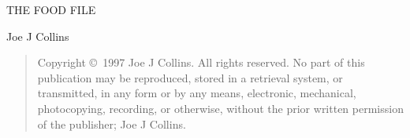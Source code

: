 \documentclass{cookbook}
\begin{document}
\thispagestyle{empty}
\begin{center}
\Huge THE FOOD FILE
\end{center}
\vfill
\begin{center}
Joe J Collins
\end{center}
\clearpage
\strut %
\vfill
\begin{quotation}
\begin{rmfamily}
Copyright \copyright\ 1997 Joe J Collins.
All rights reserved.
No part of this publication may be reproduced,
stored in a retrieval system,
or transmitted,
in any form or by any means,
electronic,
mechanical,
photocopying,
recording,
or otherwise,
without the prior written permission
of the publisher;
Joe J Collins.
\end{rmfamily}
\end{quotation}
\clearpage
{}

\end{document}
